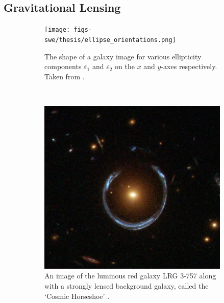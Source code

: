 \documentclass[%
 reprint,
 amsmath,amssymb,
 aps,nofootinbib
]{revtex4-1}
\begin{document}
\subsection{Gravitational Lensing} \label{grav_lensing}

\begin{figure}
    \centering
    \begin{subfigure}[H]{0.415\textwidth}
        \texttt{[image: figs-swe/thesis/ellipse\_orientations.png]}
        \captionsetup{justification=raggedright,singlelinecheck=false}
        \caption{The shape of a galaxy image for various ellipticity components $\varepsilon_1$ and $\varepsilon_2$ on the $x$ and $y$-axes respectively. Taken from \cite{schneider}.}
        \label{ellipses}
    \end{subfigure}
    ~
    \begin{subfigure}[H]{0.425\textwidth}
        \includegraphics[width=\textwidth]{figs-swe/thesis/einstein_ring.png}
        \captionsetup{justification=raggedright,singlelinecheck=false}
        \caption{An image of the luminous red galaxy LRG 3-757 along with a strongly lensed background galaxy, called the `Cosmic Horseshoe' \cite{einstein_ring}.}
        \label{einstein_ring}
    \end{subfigure}
    \caption{}
\end{figure}
\end{document}
